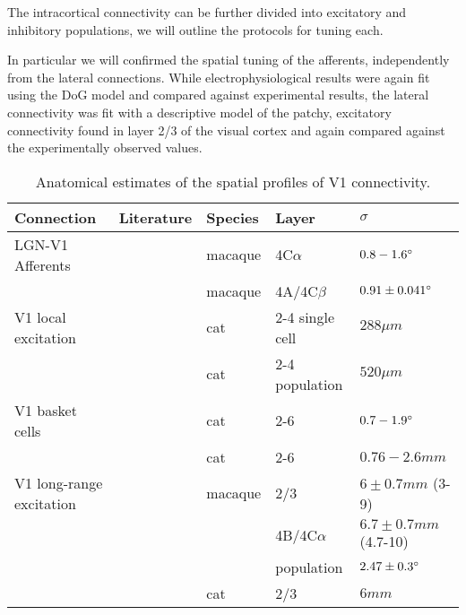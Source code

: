 The intracortical connectivity can be further divided into excitatory
and inhibitory populations, we will outline the protocols for tuning
each.

In particular we will confirmed the spatial tuning of the afferents,
independently from the lateral connections. While electrophysiological
results were again fit using the DoG model and compared against
experimental results, the lateral connectivity was fit with a
descriptive model of the patchy, excitatory connectivity found in
layer 2/3 of the visual cortex and again compared against the
experimentally observed values.


\begin{table}
  \centering
  \begin{adjustbox}{width=1\textwidth}
  \begin{tabular}{l | l l l l}
    Connection               & Literature            & Species & Layer & $\sigma$ \\
    \hline
    LGN-V1 Afferents         & \cite{Angelucci2002c} & macaque & 4C$\alpha$ & $0.8-1.6\degree$ \\
                             & \cite{Angelucci2006a} & macaque & 4A/4C$\beta$ & $0.91 \pm 0.041 \degree$ \\
    \hline
    V1 local excitation      & \cite{Buzas2006}      & cat      & 2-4 single cell & $288 \mu m$ \\
                             & \cite{Buzas2006}      & cat      & 2-4 population  & $520 \mu m$ \\
    \hline
    V1 basket cells          & \cite{Buzas2001}      & cat      & 2-6 & $0.7-1.9 \degree$ \\
                             & \cite{Buzas2001}      & cat      & 2-6 & $0.76-2.6 mm$ \\
    \hline
    V1 long-range excitation & \cite{Angelucci2002}  & macaque  & 2/3 & $6\pm 0.7 mm$ (3-9) \\
                             &                       &          & 4B/4C$\alpha$ & $6.7 \pm 0.7 mm$ (4.7-10) \\
                             &                       &          & population & $2.47 \pm 0.3 \degree$ \\
                             & \cite{Buzas2006}      & cat      & 2/3 & $6 mm$ \\
    \hline
  \end{tabular}
  \end{adjustbox}
  \caption[]%
          {Anatomical estimates of the spatial profiles of V1 connectivity.}
  \label{anatomicaltable}
\end{table}

